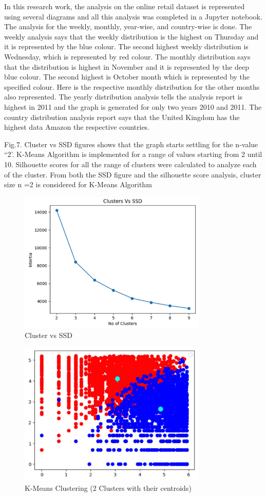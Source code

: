 \documentclass[conference]{IEEEtran}
\begin{document}
 
 In this research work, the analysis on the online retail dataset is represented using several diagrams and all this analysis was completed in a Jupyter notebook. The analysis for the weekly, monthly, year-wise, and country-wise is done. The weekly analysis says that the weekly distribution is the highest on Thursday and it is represented by the blue colour. The second highest weekly distribution is Wednesday, which is represented by red colour. The monthly distribution says that the distribution is highest in November and it is represented by the deep blue colour. The second highest is October month which is represented by the specified colour. Here is the respective monthly distribution for the other months also represented. The yearly distribution analysis tells the analysis report is highest in 2011 and the graph is generated for only two years 2010 and 2011. The country distribution analysis report says that the United Kingdom has the highest data Amazon the respective countries.

Fig.7. Cluster vs SSD figures shows that the graph starts settling for the n-value ``2'. K-Means Algorithm is implemented for a range of values starting from 2 until 10. Silhouette scores for all the range of clusters were calculated to analyze each of the cluster. From both the SSD figure and the silhouette score analysis, cluster size n =2 is considered for K-Means Algorithm

 \begin{figure}[h]
\centering
 \includegraphics[width=9cm]{elbow}
 \caption{Cluster vs SSD}
 \end{figure}
 
  \begin{figure}[h]
\centering
 \includegraphics[width=9cm]{km}
 \caption{K-Means Clustering (2 Clusters with their centroids)}
 \end{figure}
 
\end{document}
